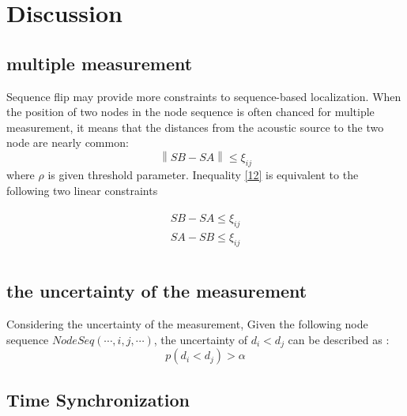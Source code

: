 \section{Discussion}

\subsection{multiple measurement}
 Sequence flip may provide more constraints to sequence-based localization. 
 When the position of two nodes in the node sequence is often chanced for multiple measurement, 
it means that the distances from the acoustic source to the two node are nearly common:
   \begin{equation} \label{12}
 \left\| {SB - SA } \right\| \le \xi _{ij}
  \end{equation}
 where $\rho$ is given threshold parameter. Inequality \eqref{12} is equivalent to the following two linear constraints

 \begin{eqnarray} \label{13}
 \begin{array}{l}
 SB-SA \le \xi _{ij}  \\
  SA-SB \le \xi _{ij}  \\
  \end{array}
 \end{eqnarray}



 \subsection{the uncertainty of the measurement}
 Considering the uncertainty of the measurement,
 Given the following node sequence $NodeSeq( \cdots ,i,j, \cdots )$, the uncertainty of ${d_i} < {d_j}$ can be described as : 
 \begin{equation}
 p({d_i} < {d_j})>\alpha
 \end{equation}






\subsection{Time Synchronization }

